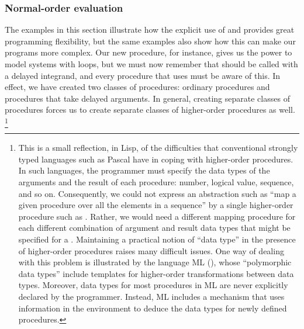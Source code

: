 \subsubsection*{Normal-order evaluation}

The examples in this section illustrate how the explicit use of  and  provides great programming flexibility, but the same examples also show how this can make our programs more complex.
Our new  procedure, for instance, gives us the power to model systems with loops, but we must now remember that  should be called with a delayed integrand, and every procedure that uses  must be aware of this.
In effect, we have created two classes of procedures:
ordinary procedures and procedures that take delayed arguments.
In general, creating separate classes of procedures forces us to create separate classes of higher-order procedures as well.%
\footnote{
	This is a small reflection, in Lisp, of the difficulties that conventional strongly typed languages such as Pascal have in coping with higher-order procedures.
	In such languages, the programmer must specify the data types of the arguments and the result of each procedure:
	number, logical value, sequence, and so on.
	Consequently, we could not express an abstraction such as “map a given procedure  over all the elements in a sequence” by a single higher-order procedure such as .
	Rather, we would need a different mapping procedure for each different combination of argument and result data types that might be specified for a .
	Maintaining a practical notion of “data type” in the presence of higher-order procedures raises many difficult issues.
	One way of dealing with this problem is illustrated by the language ML (), whose “polymorphic data types” include templates for higher-order transformations between data types.
	Moreover, data types for most procedures in ML are never explicitly declared by the programmer.
	Instead, ML includes a  mechanism that uses information in the environment to deduce the data types for newly defined procedures.
}

